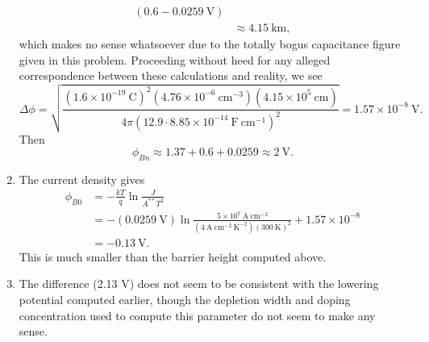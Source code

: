 \documentclass{article}
\begin{document}
\begin{enumerate}
{\begin{align*}
{                           (0.6 - 0.0259 ~\mathrm{V})} \\
             &\approx 4.15 ~\mathrm{km},
       \end{align*}
       which makes no sense whatsoever due to the totally bogus capacitance 
       figure given in this problem. Proceeding without heed for any 
       alleged correspondence between these calculations and reality, we see
       $$
       \Delta \phi = \sqrt{\frac{(1.6 \times 10^{-19} ~\mathrm{C})^2 
                                 (4.76 \times 10^{-6} ~\mathrm{cm}^{-3})
                                 (4.15 \times 10^{5}  ~\mathrm{cm})}
                                {4 \pi (12.9 \cdot 8.85 \times 10^{-14} ~\mathrm{F}~\mathrm{cm}^{-1})^2}} = 1.57 \times 10^{-8} ~\mathrm{V}.
       $$
       Then 
       $$
       \phi_{Bn} \approx 1.37 + 0.6 + 0.0259 \approx 2 ~\mathrm{V}.
       $$
   }
   \item{The current density gives 
   \begin{align*}
     \phi_{B0} &= -\frac{kT}{q} \ln \frac{J}{A^{\ast \ast} T^2} \\
               &= -(0.0259 ~\mathrm V) 
                    \ln \frac{5 \times 10^{7} ~\mathrm{A}~\mathrm{cm}^{-2}}
                                {(4 ~\mathrm{A}~\mathrm{cm^{-2}}~\mathrm{K}^{-2})
                                 (300 ~\mathrm{K})^2} + 1.57 \times 10^{-8}\\
               &= -0.13 ~\mathrm{V}.
   \end{align*}
   This is much smaller than the barrier height computed above.
   }
   \item{The difference (2.13 V) does not seem to be consistent with the lowering potential 
         computed earlier, though the depletion width and doping concentration
         used to compute this parameter do not seem to make any sense.}
\end{enumerate}
\end{document}
